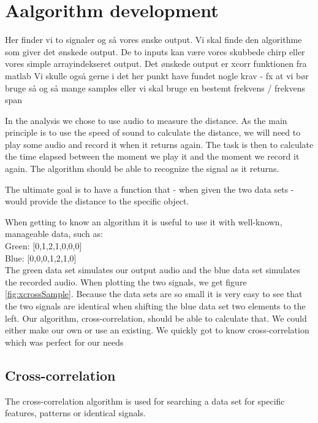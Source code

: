 \chapter{Aalgorithm development}
Her finder vi to signaler og så vores ønske output. Vi skal finde den algorithme som giver det ønskede output. De to inputs kan være vores skubbede chirp eller vores simple arrayindekseret output. Det ønskede output er xcorr funktionen fra matlab
Vi skulle også gerne i det her punkt have fundet nogle krav - fx at vi bør bruge så og så mange samples eller vi skal bruge en bestemt frekvens / frekvens span

In the analysis we chose to use audio to measure the distance. As the main principle is to use the speed of sound to calculate the distance, we will need to play some audio and record it when it returns again. The task is then to calculate the time elapsed between the moment we play it and the moment we record it again. The algorithm should be able to recognize the signal as it returns. 

The ultimate goal is to have a function that - when given the two data sets - would provide the distance to the specific object.

When getting to know an algorithm it is useful to use it with well-known, manageable data, such as:
\\
Green: [0,1,2,1,0,0,0]\\
Blue: [0,0,0,1,2,1,0]\\
The green data set simulates our output audio and the blue data set simulates the recorded audio. When plotting the two signals, we get figure \ref{fig:xcrossSample}. Because the data sets are so small it is very easy to see that the two signals are identical when shifting the blue data set two elements to the left. Our algorithm, cross-correlation, should be able to calculate that. We could either make our own or use an existing. We quickly got to know cross-correlation which was perfect for our needs

\section{Cross-correlation}
The cross-correlation algorithm is used for searching a data set for specific features, patterns or identical signals.

